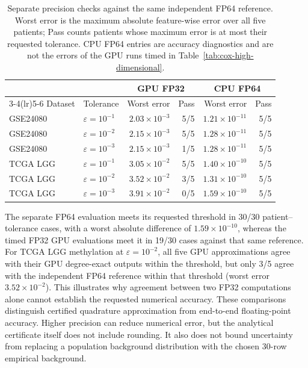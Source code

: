\begin{table}[t]
\centering
\small
\setlength{\tabcolsep}{4pt}
\begin{tabular}{llrrrr}
\toprule
 & & \multicolumn{2}{c}{GPU FP32} & \multicolumn{2}{c}{CPU FP64} \\
\cmidrule(lr){3-4}\cmidrule(lr){5-6}
Dataset & Tolerance & Worst error & Pass & Worst error & Pass \\
\midrule
GSE24080 & $\varepsilon=10^{-1}$ & $2.03\times10^{-3}$ & 5/5 & $1.21\times10^{-11}$ & 5/5 \\
GSE24080 & $\varepsilon=10^{-2}$ & $2.15\times10^{-3}$ & 5/5 & $1.28\times10^{-11}$ & 5/5 \\
GSE24080 & $\varepsilon=10^{-3}$ & $2.15\times10^{-3}$ & 1/5 & $1.28\times10^{-11}$ & 5/5 \\
TCGA LGG & $\varepsilon=10^{-1}$ & $3.05\times10^{-2}$ & 5/5 & $1.40\times10^{-10}$ & 5/5 \\
TCGA LGG & $\varepsilon=10^{-2}$ & $3.52\times10^{-2}$ & 3/5 & $1.31\times10^{-10}$ & 5/5 \\
TCGA LGG & $\varepsilon=10^{-3}$ & $3.91\times10^{-2}$ & 0/5 & $1.59\times10^{-10}$ & 5/5 \\
\bottomrule
\end{tabular}
\caption{Separate precision checks against the same independent FP64
reference. Worst error is the maximum absolute feature-wise error over all
five patients; Pass counts patients whose maximum error is at most their
requested tolerance. CPU FP64 entries are accuracy diagnostics and are
not the errors of the GPU runs timed in Table~\ref{tab:cox-high-dimensional}.}
\label{tab:cox-precision-checks}
\end{table}

The separate FP64 evaluation meets its requested threshold in 30/30
patient--tolerance cases, with a worst absolute difference of $1.59\times10^{-10}$,
whereas the timed FP32 GPU evaluations meet it in 19/30 cases
against that same reference.
For TCGA LGG methylation at $\varepsilon=10^{-2}$,
all five GPU approximations agree with their GPU degree-exact outputs
within the threshold, but only 3/5 agree with the independent
FP64 reference within that threshold (worst error $3.52\times10^{-2}$).
This illustrates why agreement between two FP32 computations alone
cannot establish the requested numerical accuracy.
These comparisons distinguish certified quadrature approximation from
end-to-end floating-point accuracy. Higher precision can reduce numerical
error, but the analytical certificate itself does not include rounding.
It also does not bound uncertainty from replacing a population background
distribution with the chosen 30-row empirical background.
